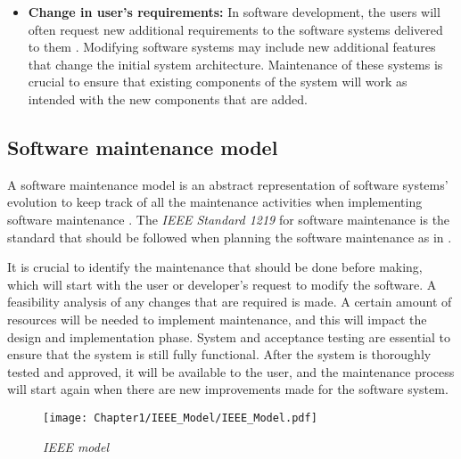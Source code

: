 \begin{itemize}
	\item \textbf{Change in user's requirements:} In software development, the users will often request new additional requirements to the software systems delivered to them \cite{Ogheneovo2014}. Modifying software systems may include new additional features that change the initial system architecture. Maintenance of these systems is crucial to ensure that existing components of the system will work as intended with the new components that are added.
\end{itemize}

\subsection{Software maintenance model}
A software maintenance model is an abstract representation of software systems' evolution to keep track of all the maintenance activities when implementing software maintenance \cite{Ren2011}. The \textit{IEEE Standard 1219} for software maintenance is the standard that should be followed when planning the software maintenance as in .\par It is crucial to identify the maintenance that should be done before making, which will start with the user or developer's request to modify the software. A feasibility analysis of any changes that are required is made. A certain amount of resources will be needed to implement maintenance, and this will impact the design and implementation phase. System and acceptance testing are essential to ensure that the system is still fully functional. After the system is thoroughly tested and approved, it will be available to the user, and the maintenance process will start again when there are new improvements made for the software system.

\begin{figure}[!htb] %
	\centering %
	\texttt{[image: Chapter1/IEEE\_Model/IEEE\_Model.pdf]}
	\caption[IEEE model]
	{\textit{IEEE model \cite{Ren2011}}} \label{fig:CH1_IEEE_Model}
\end{figure}

